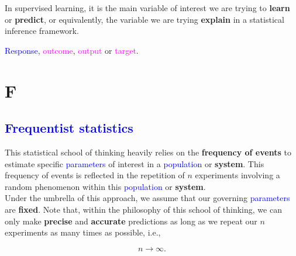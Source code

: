 \documentclass[
  letterpaper,
  DIV=11,
  numbers=noendperiod]{scrreprt}
\begin{document}
In supervised learning, it is the main variable of interest we are
trying to \textbf{learn} or \textbf{predict}, or equivalently, the
variable we are trying \textbf{explain} in a statistical inference
framework.

\begin{tcolorbox}[enhanced jigsaw, bottomrule=.15mm, breakable, colback=white, leftrule=.75mm, coltitle=black, rightrule=.15mm, bottomtitle=1mm, title=\textcolor{quarto-callout-warning-color}{\faExclamationTriangle}\hspace{0.5em}{Equivalent to:}, opacitybacktitle=0.6, toprule=.15mm, titlerule=0mm, arc=.35mm, colbacktitle=quarto-callout-warning-color!10!white, toptitle=1mm, colframe=quarto-callout-warning-color-frame, left=2mm, opacityback=0]

\textcolor{blue}{Response}, \textcolor{magenta}{outcome},
\textcolor{magenta}{output} or \textcolor{magenta}{target}.

\end{tcolorbox}

\section*{F}\label{f}


\subsection*{\texorpdfstring{\textcolor{blue}{Frequentist statistics}}{}}\label{section-2}

This statistical school of thinking heavily relies on the
\textbf{frequency of events} to estimate specific
\textcolor{blue}{parameters} of interest in a
\textcolor{blue}{population} or \textbf{system}. This frequency of
events is reflected in the repetition of \(n\) experiments involving a
random phenomenon within this \textcolor{blue}{population} or
\textbf{system}.\\

Under the umbrella of this approach, we assume that our governing
\textcolor{blue}{parameters} are \textbf{fixed}. Note that, within the
philosophy of this school of thinking, we can only make \textbf{precise}
and \textbf{accurate} predictions as long as we repeat our \(n\)
experiments as many times as possible, i.e.,

\[
n \rightarrow \infty.
\]
\end{document}
